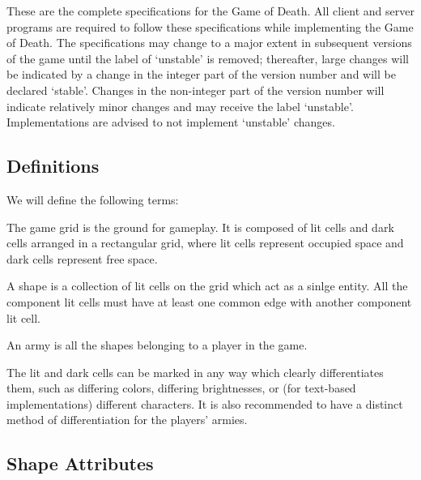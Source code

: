 \documentclass[a4paper,11pt]{article}
\begin{document}
These are the complete specifications for the Game of Death. All client and server programs are required to follow these specifications while implementing the Game of Death. The specifications may change to a major extent in subsequent versions of the game until the label of `unstable' is removed; thereafter, large changes will be indicated by a change in the integer part of the version number and will be declared `stable'. Changes in the non-integer part of the version number will indicate relatively minor changes and may receive the label `unstable'. Implementations are advised to not implement `unstable' changes.

\subsection{Definitions}

We will define the following terms:
\begin{description}
\addtolength{\itemsep}{-4pt}
    \item[game grid] The game grid is the ground for gameplay. It is composed of lit cells and dark cells arranged in a rectangular grid, where lit cells represent occupied space and dark cells represent free space.
    \item[shape] A shape is a collection of lit cells on the grid which act as a sinlge entity. All the component lit cells must have at least one common edge with another component lit cell.
    \item[army] An army is all the shapes belonging to a player in the game.
\end{description}

The lit and dark cells can be marked in any way which clearly differentiates them, such as differing colors, differing brightnesses, or (for text-based implementations) different characters. It is also recommended to have a distinct method of differentiation for the players' armies.

\subsection{Shape Attributes}
\end{document}

